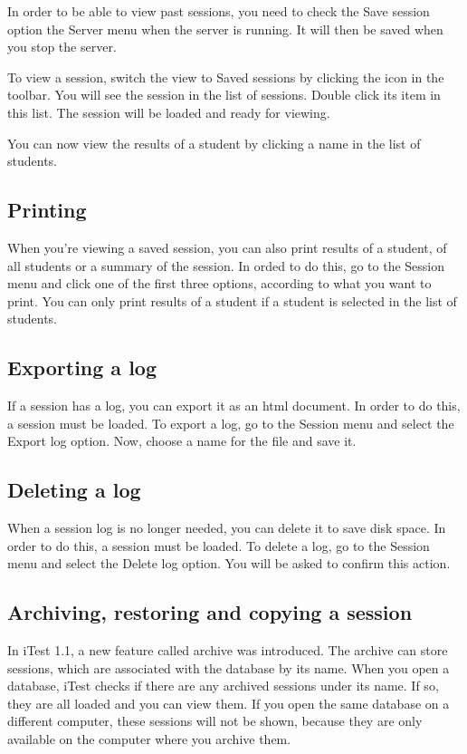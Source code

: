 In order to be able to view past sessions, you need to check the Save session option the Server menu when the server is running.
It will then be saved when you stop the server.

To view a session, switch the view to Saved sessions by clicking the icon in the toolbar.
You will see the session in the list of sessions.
Double click its item in this list.
The session will be loaded and ready for viewing.


You can now view the results of a student by clicking a name in the list of students.

\subsection{Printing}

When you're viewing a saved session, you can also print results of a student, of all students or a summary of the session.
In orded to do this, go to the Session menu and click one of the first three options, according to what you want to print.
You can only print results of a student if a student is selected in the list of students.

\subsection{Exporting a log}

If a session has a log, you can export it as an html document.
In order to do this, a session must be loaded.
To export a log, go to the Session menu and select the Export log option.
Now, choose a name for the file and save it.

\subsection{Deleting a log}

When a session log is no longer needed, you can delete it to save disk space.
In order to do this, a session must be loaded.
To delete a log, go to the Session menu and select the Delete log option.
You will be asked to confirm this action.

\subsection{Archiving, restoring and copying a session}

In iTest 1.1, a new feature called archive was introduced.
The archive can store sessions, which are associated with the database by its name.
When you open a database, iTest checks if there are any archived sessions under its name.
If so, they are all loaded and you can view them.
If you open the same database on a different computer, these sessions will not be shown, because they are only available on the computer where you archive them.


